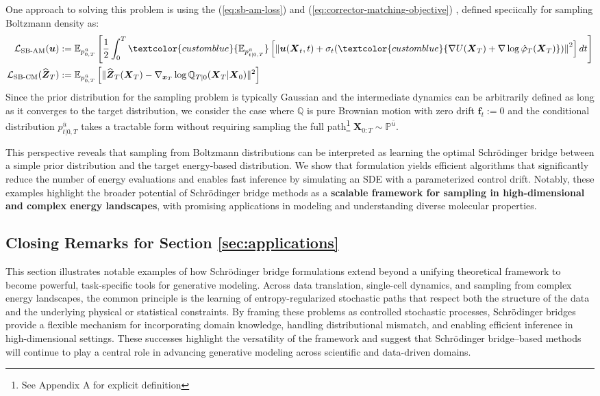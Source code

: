 \documentclass{article}
\newcommand{\bluetext}[1]{\textcolor{customblue}{#1}}
\begin{document}
One approach to solving this problem is using the (\ref{eq:sb-am-loss}) and (\ref{eq:corrector-matching-objective}) \citep{liu2025adjoint}, defined speciically for sampling Boltzmann density as:
\begin{align}
    \mathcal{L}_{\text{SB-AM}}(\boldsymbol{u})&:=\mathbb{E}_{p^{\bar{u}}_{0,T}}\left[\frac{1}{2}\int_0^T\bluetext{\mathbb{E}_{p^{\bar{u}}_{t|0,T}}}\left[\left\|\boldsymbol{u}(\boldsymbol{X}_t,t)+\sigma_t(\bluetext{\nabla U(\boldsymbol{X}_T)+ \nabla \log\hat\varphi_T(\boldsymbol{X}_T)})\right\|^2\right]dt\right]\\
    \mathcal{L}_{\text{SB-CM}}(\widehat{\boldsymbol{Z}}_T)&:=\mathbb{E}_{p^{\bar{u}}_{0,T}}\left[\|\widehat{\boldsymbol{Z}}_T(\boldsymbol{X}_T)-\nabla_{\boldsymbol{x}_T}\log \mathbb{Q}_{T|0}(\boldsymbol{X}_T|\boldsymbol{X}_0)\|^2\right]
\end{align}
Since the prior distribution for the sampling problem is typically Gaussian and the intermediate dynamics can be arbitrarily defined as long as it converges to the target distribution, we consider the case where $\mathbb{Q}$ is pure Brownian motion with zero drift $\boldsymbol{f}_t:=0$ and the conditional distribution $p^{\bar{u}}_{t|0,T}$ takes a tractable form without requiring sampling the full path\footnote{See \citep{liu2025adjoint} Appendix A for explicit definition} $\boldsymbol{X}_{0:T}\sim \mathbb{P}^{\bar{u}}$.

This perspective reveals that sampling from Boltzmann distributions can be interpreted as learning the optimal Schrödinger bridge between a simple prior distribution and the target energy-based distribution. We show that formulation yields efficient algorithms that significantly reduce the number of energy evaluations and enables fast inference by simulating an SDE with a parameterized control drift. Notably, these examples highlight the broader potential of Schrödinger bridge methods as a \textbf{scalable framework for sampling in high-dimensional and complex energy landscapes}, with promising applications in modeling and understanding diverse molecular properties.

\subsection{Closing Remarks for Section \ref{sec:applications}}
This section illustrates notable examples of how Schrödinger bridge formulations extend beyond a unifying theoretical framework to become powerful, task-specific tools for generative modeling. Across data translation, single-cell dynamics, and sampling from complex energy landscapes, the common principle is the learning of entropy-regularized stochastic paths that respect both the structure of the data and the underlying physical or statistical constraints. By framing these problems as controlled stochastic processes, Schrödinger bridges provide a flexible mechanism for incorporating domain knowledge, handling distributional mismatch, and enabling efficient inference in high-dimensional settings. These successes highlight the versatility of the framework and suggest that Schrödinger bridge–based methods will continue to play a central role in advancing generative modeling across scientific and data-driven domains.
\end{document}

